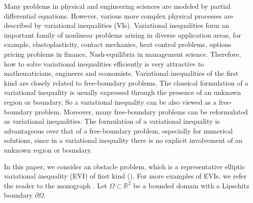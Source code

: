 \documentclass[12pt]{article}
\begin{document}
Many problems in physical and engineering sciences are modeled
by partial differential equations. However, various more complex 
physical processes are described by variational inequalities (VIs). 
Variational inequalities form an important family of nonlinear problems 
arising in diverse application areas, for example, elastoplasticity,
contact mechanics, heat control problems, 
options pricing problems in finance, Nash-equilibria in management science.
Therefore, how to solve variational inequalities efficiently is very attractive to 
mathematicians, engineers and economists. Variational inequalities of the first kind are 
closely related to free-boundary problems. The classical formulation of a 
variational inequality is usually expressed through the presence of an unknown 
region or boundary. So a variational inequality can be also viewed as a free-boundary
problem. Moreover, many free-boundary problems can be reformulated
as variational inequalities. The formulation of a variational inequality is advantageous 
over that of a free-boundary problem, especially for numerical solutions, since
in a variational inequality there is no explicit involvement of an unknown
region or boundary.

In this paper, we consider an obstacle problem, which is a representative 
elliptic variational inequality (EVI) of first kind (\cite{glowinski84}). 
For more examples of EVIs, we refer the reader to the monograph \cite{duvaut76}. 
Let $\Omega\subset\mathbb{R}^2$ be a bounded domain with a Lipschitz boundary $\partial\Omega$.
\end{document}
